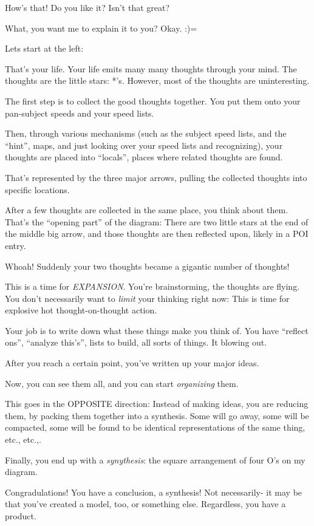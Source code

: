 \documentclass[oneside]{book}
\begin{document}
How's that! Do you like it? Isn't that great?

What, you want me to explain it to you? Okay. {:)}=

Lets start at the left:

That's your life. Your life emits many many thoughts through your
mind. The thoughts are the little stars: *'s. However, most of the
thoughts are uninteresting.

The first step is to collect the good thoughts together. You put them
onto your pan-subject speeds and your speed lists.

Then, through various mechanisms (such as the subject speed lists, and
the ``hint'', maps, and just looking over your speed lists and
recognizing), your thoughts are placed into ``locals'', places where
related thoughts are found.

That's represented by the three major arrows, pulling the collected
thoughts into specific locations.

After a few thoughts are collected in the same place, you think about
them. That's the ``opening part'' of the diagram: There are two little
stars at the end of the middle big arrow, and those thoughts are then
reflected upon, likely in a POI entry.

Whoah! Suddenly your two thoughts became a gigantic number of
thoughts!

This is a time for \emph{EXPANSION}. You're brainstorming, the thoughts are
flying. You don't necessarily want to \emph{limit} your thinking right now:
This is time for explosive hot thought-on-thought action.

Your job is to write down what these things make you think of. You
have ``reflect ons'', ``analyze this's'', lists to build, all sorts of
things. It blowing out.

After you reach a certain point, you've written up your major ideas.

Now, you can see them all, and you can start \emph{organizing} them.

This goes in the OPPOSITE direction: Instead of making ideas, you are
reducing them, by packing them together into a synthesis. Some will go
away, some will be compacted, some will be found to be identical
representations of the same thing, etc., etc.,.

Finally, you end up with a \emph{synythesis}: the square arrangement of
four O's on my diagram.

Congradulations! You have a conclusion, a synthesis!  Not necessarily-
it may be that you've created a model, too, or something
else. Regardless, you have a product.
\end{document}
